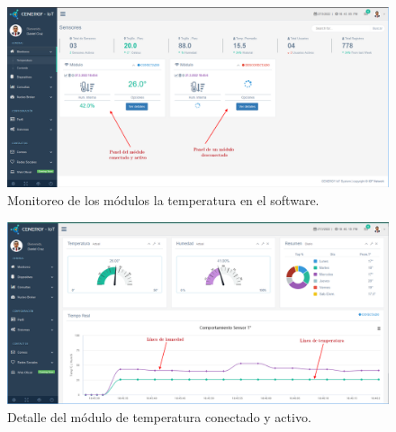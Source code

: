 \begin{landscape} %
\begin{figure}[htpb]
\centering 
\includegraphics[width=1.7\textwidth]{./Figures/test/temp/lectura.png}
\caption{Monitoreo de los módulos la temperatura en el software.}
\label{fig:temp-lectura}
\end{figure}
\end{landscape} %


\begin{landscape} %
\begin{figure}[htpb]
\centering 
\includegraphics[width=1.7\textwidth]{./Figures/test/temp/detalle.png}
\caption{Detalle del módulo de temperatura conectado y activo.}
\label{fig:temp-detalle}
\end{figure}
\end{landscape} %

